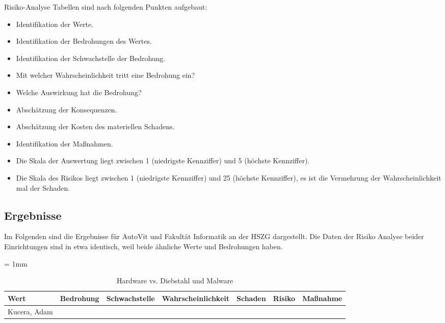 Risiko-Analyse Tabellen sind nach folgenden Punkten aufgebaut:
\begin{itemize}
\item Identifikation der Werte.
\item Identifikation der Bedrohungen des Wertes.
\item Identifikation der Schwachstelle der Bedrohung.
\item Mit welcher Wahrscheinlichkeit tritt eine Bedrohung ein? 
\item Welche Auswirkung hat die Bedrohung?
\item Abschätzung der Konsequenzen.
\item Abschätzung  der Kosten des materiellen Schadens.
\item Identifikation der Maßnahmen.
\item Die Skala der Auswertung liegt zwischen 1 (niedrigste Kennziffer) und 5 (höchste Kennziffer). 
\item Die Skala des Risikos liegt zwischen 1 (niedrigste Kennziffer) und 25 (höchste Kennziffer), es ist die Vermehrung der Wahrscheinlichkeit mal der Schaden.
\end{itemize}

\subsection{Ergebnisse}
Im Folgenden sind die Ergebnisse für AutoVit und Fakultät Informatik an der HSZG dargestellt. Die Daten der Risiko Analyse beider Einrichtungen sind in etwa identisch, weil beide ähnliche Werte und Bedrohungen haben.

\begin{table}[H]
	\sffamily
	\caption{Hardware vs. Diebstahl und Malware}
	\tabulinesep = 1mm %
	\centering
		\begin{tabu} to 0.9\textwidth {| X[1]  X[1, p] | X[1] | X[1] | X[1] | X[1] | X[1] |}
		\hline
		\textbf{Wert} & \textbf{Bedrohung} & \textbf{Schwachstelle} & \textbf{Wahrscheinlichkeit} & \textbf{Schaden} & \textbf{Risiko} & \textbf{Maßnahme}\\
		\hline 
		Kucera, Adam &  & & & & &\\
		\hline
	\end{tabu}
\end{table}


